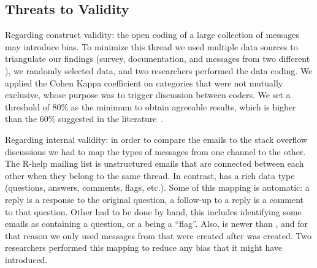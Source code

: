 

\subsection{Threats to Validity}
\label{cha:threats}


Regarding construct validity: the open coding of a large collection of messages may introduce bias.  To minimize this thread we used multiple data sources to
triangulate our findings (survey, documentation, and messages from two different \channels), we randomly selected data, and two researchers
performed the data coding. We applied the Cohen Kappa coefficient on categories that were not mutually exclusive, whose purpose was to trigger discussion
between coders.  We set a threshold of 80\% as the minimum to obtain agreeable results, which is higher than the 60\% suggested in the
literature~\cite{Landis1977}. 

Regarding internal validity: in order to compare the emails to the stack overflow discussions we had to map the types of messages from one channel to the
other. The R-help mailing list is unstructured emails that are connected between each other when they belong to the same thread. In contrast, \SO has a rich
data type (questions, answers, comments, flags, etc.). Some of this mapping is automatic: a reply is a response to the original question, a follow-up to a reply
is a comment to that question. Other had to be done by hand, this includes identifying some emails as containing a question, or a being a ``flag''.
Also, \SO is newer than \RH, and for that reason we only used messages from \RH that were created after \SO was created.
Two researchers performed this mapping to reduce any bias that it might have  introduced.


